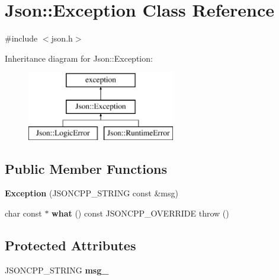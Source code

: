 \hypertarget{classJson_1_1Exception}{}\section{Json\+:\+:Exception Class Reference}
\label{classJson_1_1Exception}


{\ttfamily \#include $<$json.\+h$>$}

Inheritance diagram for Json\+:\+:Exception\+:\begin{figure}[H]
\begin{center}
\leavevmode
\includegraphics[height=3.000000cm]{classJson_1_1Exception}
\end{center}
\end{figure}
\subsection*{Public Member Functions}
\begin{DoxyCompactItemize}
\item 
{\bfseries Exception} (J\+S\+O\+N\+C\+P\+P\+\_\+\+S\+T\+R\+I\+NG const \&msg)\hypertarget{classJson_1_1Exception_ae764aa42e0755bd4ce9d303e2733fa8f}{}\label{classJson_1_1Exception_ae764aa42e0755bd4ce9d303e2733fa8f}

\item 
char const  $\ast$ {\bfseries what} () const J\+S\+O\+N\+C\+P\+P\+\_\+\+O\+V\+E\+R\+R\+I\+DE  throw ()\hypertarget{classJson_1_1Exception_ae84647676cb4eeca23de8b5723f10b11}{}\label{classJson_1_1Exception_ae84647676cb4eeca23de8b5723f10b11}

\end{DoxyCompactItemize}
\subsection*{Protected Attributes}
\begin{DoxyCompactItemize}
\item 
J\+S\+O\+N\+C\+P\+P\+\_\+\+S\+T\+R\+I\+NG {\bfseries msg\+\_\+}\hypertarget{classJson_1_1Exception_aae3cbb8b45bf21480f64502a8329659f}{}\label{classJson_1_1Exception_aae3cbb8b45bf21480f64502a8329659f}

\end{DoxyCompactItemize}


